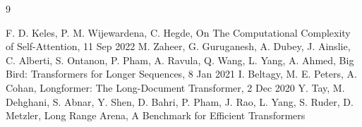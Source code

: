 \documentclass{article}
\begin{document}


\begin{thebibliography}{9} %

F. D. Keles, P. M. Wijewardena, C. Hegde, On The Computational Complexity of Self-Attention, 11 Sep 2022
M. Zaheer, G. Guruganesh, A. Dubey, J. Ainslie, C. Alberti, S. Ontanon, P. Pham, A. Ravula, Q. Wang, L. Yang, A. Ahmed, Big Bird: Transformers for Longer Sequences, 8 Jan 2021
I. Beltagy, M. E. Peters, A. Cohan, Longformer: The Long-Document Transformer, 2 Dec 2020
Y. Tay, M. Dehghani, S. Abnar, Y. Shen, D. Bahri, P. Pham, J. Rao, L. Yang, S. Ruder, D. Metzler, Long Range Arena, A Benchmark for Efficient Transformers

\end{thebibliography}
\end{document}
